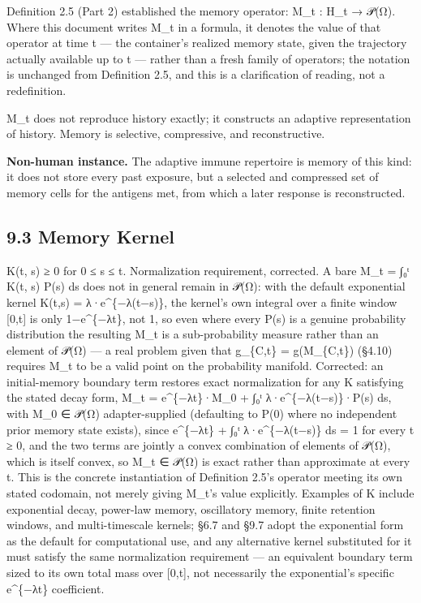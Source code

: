 \documentclass[
]{article}
\begin{document}
Definition 2.5 (Part 2) established the memory operator: M\_t : H\_t →
𝒫(Ω). Where this document writes M\_t in a formula, it denotes the value
of that operator at time t --- the container's realized memory state,
given the trajectory actually available up to t --- rather than a fresh
family of operators; the notation is unchanged from Definition 2.5, and
this is a clarification of reading, not a redefinition.

M\_t does not reproduce history exactly; it constructs an adaptive
representation of history. Memory is selective, compressive, and
reconstructive.

\textbf{Non-human instance.} The adaptive immune repertoire is memory of
this kind: it does not store every past exposure, but a selected and
compressed set of memory cells for the antigens met, from which a later
response is reconstructed.

\hypertarget{memory-kernel}{%
\subsection{9.3 Memory Kernel}\label{memory-kernel}}

K(t, s) ≥ 0 for 0 ≤ s ≤ t. Normalization requirement, corrected. A bare
M\_t = ∫₀ᵗ K(t, s) P(s) ds does not in general remain in 𝒫(Ω): with the
default exponential kernel K(t,s) = λ·e\^{}\{−λ(t−s)\}, the kernel's own
integral over a finite window {[}0,t{]} is only 1−e\^{}\{−λt\}, not 1,
so even where every P(s) is a genuine probability distribution the
resulting M\_t is a sub-probability measure rather than an element of
𝒫(Ω) --- a real problem given that g\_\{C,t\} = g(M\_\{C,t\}) (§4.10)
requires M\_t to be a valid point on the probability manifold.
Corrected: an initial-memory boundary term restores exact normalization
for any K satisfying the stated decay form, M\_t = e\^{}\{−λt\}·M\_0 +
∫₀ᵗ λ·e\^{}\{−λ(t−s)\}·P(s) ds, with M\_0 ∈ 𝒫(Ω) adapter-supplied
(defaulting to P(0) where no independent prior memory state exists),
since e\^{}\{−λt\} + ∫₀ᵗ λ·e\^{}\{−λ(t−s)\} ds = 1 for every t ≥ 0, and
the two terms are jointly a convex combination of elements of 𝒫(Ω),
which is itself convex, so M\_t ∈ 𝒫(Ω) is exact rather than approximate
at every t. This is the concrete instantiation of Definition 2.5's
operator meeting its own stated codomain, not merely giving M\_t's value
explicitly. Examples of K include exponential decay, power-law memory,
oscillatory memory, finite retention windows, and multi-timescale
kernels; §6.7 and §9.7 adopt the exponential form as the default for
computational use, and any alternative kernel substituted for it must
satisfy the same normalization requirement --- an equivalent boundary
term sized to its own total mass over {[}0,t{]}, not necessarily the
exponential's specific e\^{}\{−λt\} coefficient.
\end{document}
